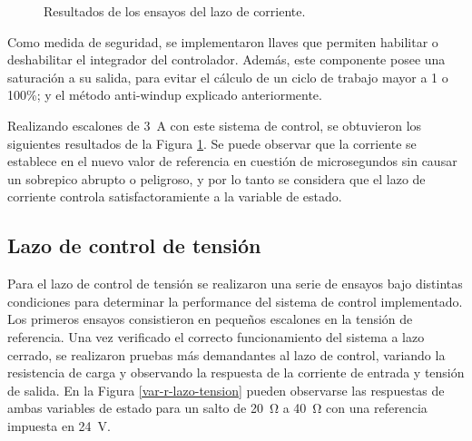 \begin{figure}[hbt!]
  \centering
  \caption{Resultados de los ensayos del lazo de corriente.}
  \label{escalones-lazo-corriente}
\end{figure}

Como medida de seguridad, se implementaron llaves que permiten habilitar o deshabilitar el integrador del controlador. Además, este componente posee una saturación a su salida, para evitar el cálculo de un ciclo de trabajo mayor a 1 o 100\%; y el método anti-windup explicado anteriormente.

Realizando escalones de \SI{3}{\ampere} con este sistema de control, se obtuvieron los siguientes resultados de la Figura \ref{escalones-lazo-corriente}. Se puede observar que la corriente se establece en el nuevo valor de referencia en cuestión de microsegundos sin causar un sobrepico abrupto o peligroso, y por lo tanto se considera que el lazo de corriente controla satisfactoramiente a la variable de estado.

\subsection{Lazo de control de tensión}

Para el lazo de control de tensión se realizaron una serie de ensayos bajo distintas condiciones para determinar la performance del sistema de control implementado. Los primeros ensayos consistieron en pequeños escalones en la tensión de referencia. Una vez verificado el correcto funcionamiento del sistema a lazo cerrado, se realizaron pruebas más demandantes al lazo de control, variando la resistencia de carga y observando la respuesta de la corriente de entrada y tensión de salida. En la Figura \ref{var-r-lazo-tension} pueden observarse las respuestas de ambas variables de estado para un salto de \SI{20}{\ohm} a \SI{40}{\ohm} con una referencia impuesta en \SI{24}{\volt}.

